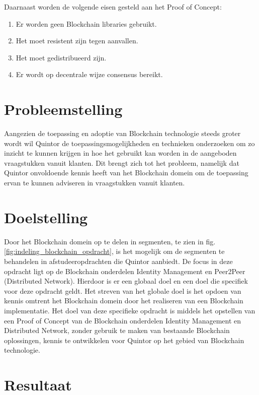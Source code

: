 Daarnaast worden de volgende eisen gesteld aan het Proof of Concept:
\begin{enumerate}[noitemsep]
  \item Er worden geen Blockchain libraries gebruikt.
  \item Het moet resistent zijn tegen aanvallen.
  \item Het moet gedistribueerd zijn.
  \item Er wordt op decentrale wijze consensus bereikt.
\end{enumerate}

\section{Probleemstelling}

Aangezien de toepassing en adoptie van Blockchain technologie steeds groter wordt wil Quintor de toepassingsmogelijkheden en technieken onderzoeken om zo inzicht te kunnen krijgen in hoe het gebruikt kan worden in de aangeboden vraagstukken vanuit klanten. Dit brengt zich tot het probleem, namelijk dat Quintor onvoldoende kennis heeft van het Blockchain domein om de toepassing ervan te kunnen adviseren in vraagstukken vanuit klanten.

\section{Doelstelling}

Door het Blockchain domein op te delen in segmenten, te zien in fig. \ref{fig:indeling_blockchain_opdracht}, is het mogelijk om de segmenten te behandelen in afstudeeropdrachten die Quintor aanbiedt. De focus in deze opdracht ligt op de Blockchain onderdelen Identity Management en Peer2Peer (Distributed Network). Hierdoor is er een globaal doel en een doel die specifiek voor deze opdracht geldt. Het streven van het globale doel is het opdoen van kennis omtrent het Blockchain domein door het realiseren van een Blockchain implementatie. Het doel van deze specifieke opdracht is middels het opstellen van een Proof of Concept van de Blockchain onderdelen Identity Management en Distributed Network, zonder gebruik te maken van bestaande Blockchain oplossingen, kennis te ontwikkelen voor Quintor op het gebied van Blockchain technologie.

\section{Resultaat}

